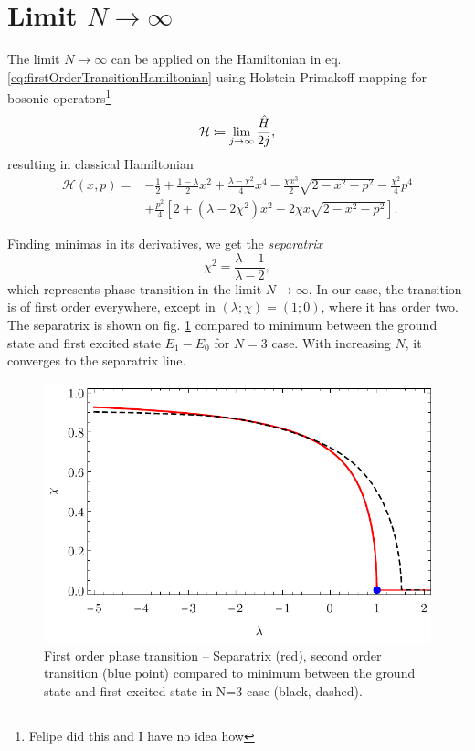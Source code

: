 \newpage
\section{Limit \texorpdfstring{$N\rightarrow \infty$}{N->infty}}
The limit $N\rightarrow \infty$ can be applied on the Hamiltonian in eq. \ref{eq:firstOrderTransitionHamiltonian} using Holstein-Primakoff mapping for bosonic operators\footnote{Felipe did this and I have no idea how}
\begin{equation}
    \mathcal{H}\coloneqq\lim_{j\rightarrow\infty}\frac{\hat{H}}{2j},
\end{equation}
resulting in classical Hamiltonian
\begin{equation}
    \begin{split}
        \mathcal{H}(x,p)=&-\frac{1}{2}+\frac{1-\lambda}{2}x^2+\frac{\lambda-\chi^2}{4}x^4-\frac{\chi x^3}{2}\sqrt{2-x^2-p^2}-\frac{\chi^2}{4}p^4\\
        &+\frac{p^2}{4}\left[2+(\lambda-2\chi^2)x^2-2\chi x\sqrt{2-x^2-p^2}\right].
    \end{split}
    \label{eq:HamiltonianClassicalLimit}
\end{equation}


Finding minimas in its derivatives, we get the \emph{separatrix}
\begin{equation}
    \chi^2=\frac{\lambda-1}{\lambda-2},
    \label{eq:separatrix}
\end{equation}
which represents phase transition in the limit $N\rightarrow \infty$. In our case, the transition is of first order everywhere, except in $(\lambda;\chi)=(1;0)$, where it has order two. The separatrix is shown on fig. \ref{fig:transitionCompare} compared to minimum between the ground state and first excited state $E_1-E_0$ for $N=3$ case. With increasing $N$, it converges to the separatrix line.

\begin{figure}[H]
    \centering
    \includegraphics{../img/infiniteN_transitionCompare.pdf}
    \caption{First order phase transition -- Separatrix (red), second order transition (blue point) compared to minimum between the ground state and first excited state in N=3 case (black, dashed).}
    \label{fig:transitionCompare}    
\end{figure}


